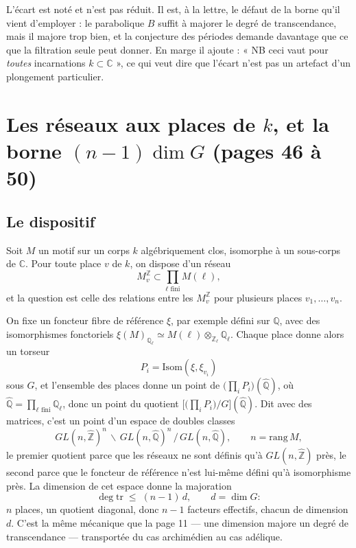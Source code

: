 \documentclass[11pt,a4paper]{article}
\begin{document}
L'écart est noté et n'est pas réduit. Il est, à la lettre, le défaut de la
borne qu'il vient d'employer : le parabolique $B$ suffit à majorer le degré de
transcendance, mais il majore trop bien, et la conjecture des périodes demande
davantage que ce que la filtration seule peut donner. En marge il ajoute :
« NB ceci vaut pour \emph{toutes} incarnations $k \subset \mathbb{C}$ », ce qui
veut dire que l'écart n'est pas un artefact d'un plongement particulier.

\section*{Les réseaux aux places de $k$, et la borne $(n-1)\dim G$ (pages 46 à 50)}

\subsection*{Le dispositif}

Soit $M$ un motif sur un corps $k$ algébriquement clos, isomorphe à un
sous-corps de $\mathbb{C}$. Pour toute place $v$ de $k$, on dispose d'un réseau
\[
  M^{\mathbb{Z}}_{v} \subset \prod_{\ell \text{ fini}} M(\ell) ,
\]
et la question est celle des relations entre les $M^{\mathbb{Z}}_{v}$ pour
plusieurs places $v_{1}, \ldots, v_{n}$.

On fixe un foncteur fibre de référence $\xi$, par exemple défini sur
$\mathbb{Q}$, avec des isomorphismes fonctoriels
$\xi(M)_{\mathbb{Q}_{\ell}} \simeq M(\ell) \otimes_{\mathbb{Z}_{\ell}}
\mathbb{Q}_{\ell}$. Chaque place donne alors un torseur
\[
  P_{i} = \mathrm{Isom}(\xi, \xi_{v_{i}})
\]
sous $G$, et l'ensemble des places donne un point de
$\bigl(\prod_{i} P_{i}\bigr)(\widehat{\mathbb{Q}})$, où $\widehat{\mathbb{Q}} =
\prod_{\ell \text{ fini}} \mathbb{Q}_{\ell}$, donc un point du quotient
$\bigl[\bigl(\prod_{i} P_{i}\bigr)/G\bigr](\widehat{\mathbb{Q}})$. Dit avec des
matrices, c'est un point d'un espace de doubles classes
\[
  GL(n, \widehat{\mathbb{Z}})^{n} \,\backslash\,
  GL(n, \widehat{\mathbb{Q}})^{n} \,/\,
  GL(n, \widehat{\mathbb{Q}}) ,
  \qquad n = \mathrm{rang}\, M ,
\]
le premier quotient parce que les réseaux ne sont définis qu'à
$GL(n, \widehat{\mathbb{Z}})$ près, le second parce que le foncteur de référence
n'est lui-même défini qu'à isomorphisme près. La dimension de cet espace donne
la majoration
\[
  \deg\mathrm{tr} \;\leqslant\; (n-1)\, d , \qquad d = \dim G :
\]
$n$ places, un quotient diagonal, donc $n-1$ facteurs effectifs, chacun de
dimension $d$. C'est la même mécanique que la page 11 — une dimension majore un
degré de transcendance — transportée du cas archimédien au cas adélique.
\end{document}
